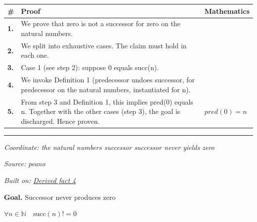 \documentclass[11pt]{article}
\theoremstyle{definition}
\begin{document}
\medskip
\noindent
\begin{tabular}{@{} >{\raggedright\arraybackslash}p{} >{\raggedright\arraybackslash}p{} >{\raggedleft\arraybackslash}p{} @{}}
\textbf{\#} & \textbf{Proof} & \textbf{Mathematics} \\
\midrule
\textbf{1.} & We prove that zero is not a successor for zero on the natural numbers. & \\[0.45em]
\textbf{2.} & We split into exhaustive cases. The claim must hold in each one. & \\[0.45em]
\textbf{3.} & Case 1 (see step 2): suppose 0  equals  succ(n). & \\[0.45em]
\textbf{4.} & We invoke Definition 1 (predecessor undoes successor, for predecessor on the natural numbers, instantiated for n). & \\[0.45em]
\textbf{5.} & From step 3 and Definition 1, this implies pred(0) equals n. Together with the other cases (step 3), the goal is discharged. Hence proven. & $\displaystyle pred(0) = n$ \\[0.45em]
\bottomrule
\end{tabular}
\label{thm:Nat-zero-zero_is_not_a_successor}
\par\medskip\hrule
\bigskip
{}\par
\smallskip\noindent\textit{Coordinate: the natural numbers \cdot successor \cdot successor never yields zero}\par
\smallskip\noindent\textit{Source: peano}\par
\smallskip\noindent\textit{Built on: \hyperref[thm:Nat-zero-zero_is_not_a_successor]{Derived fact 4}}\par
\medskip
\noindent\textbf{Goal.} Successor never produces zero\par
\noindent$\displaystyle \forall n \in \mathbb{N}\quad \mathrm{succ}(n) != 0$\par
\medskip
\noindent
\end{document}
